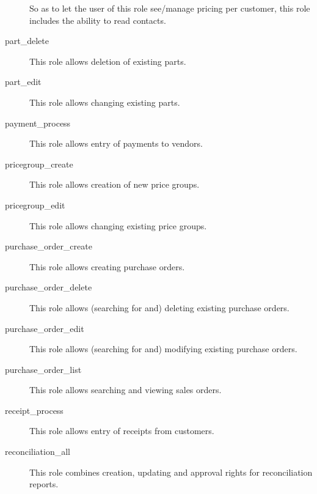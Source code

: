 \begin{description}
                         So as to let the user of this role see/manage pricing per customer, this role includes
                         the ability to read contacts.
\item [part\_delete] \htmlspacing 
                         This role allows deletion of existing parts.
\item [part\_edit] \htmlspacing 
                         This role allows changing existing parts.
\item [payment\_process] \htmlspacing 
                         This role allows entry of payments to vendors.
\item [pricegroup\_create] \htmlspacing 
                         This role allows creation of new price groups.
\item [pricegroup\_edit] \htmlspacing 
                         This role allows changing existing price groups.
\item [purchase\_order\_create] \htmlspacing 
                         This role allows creating purchase orders.
\item [purchase\_order\_delete] \htmlspacing 
                         This role allows (searching for and) deleting existing purchase orders.
\item [purchase\_order\_edit] \htmlspacing 
                         This role allows (searching for and) modifying existing purchase orders.
\item [purchase\_order\_list] \htmlspacing 
                         This role allows searching and viewing sales orders.
\item [receipt\_process] \htmlspacing 
                         This role allows entry of receipts from customers.
\item [reconciliation\_all] \htmlspacing 
                         This role combines creation, updating and approval rights for reconciliation reports.

\end{description}

